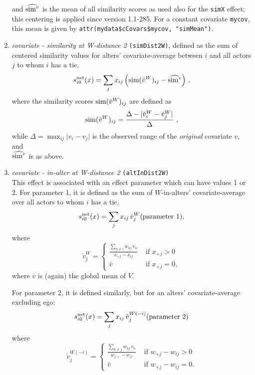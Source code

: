 \documentclass[a4paper,fleqn,11pt]{article}
\newcommand{\+}{\, + \,}
\newcommand{\vit}{\theenumi}
\begin{document}
\begin{enumerate}
 and $\widehat{{\rm sim}^v}$ is the mean of all similarity scores as used also
 for the \texttt{simX} effect; this centering is applied since version 1.1-285.
 For a constant covariate \texttt{mycov}, this mean is given by
 \texttt{attr(mydata\$cCovars\$mycov, "simMean")}.\\

 \item \emph{covariate - similarity at W-distance 2} \texttt{(simDist2W)}, %
      defined as the sum of centered similarity
      values for alters' covariate-average between $i$ and all actors
      $j$ to whom $i$ has a tie,
\[
 s^{\rm net}_{i\vit}(x) = \sum_j x_{ij}\, \Big({\rm sim}(\breve v^W)_{ij}
  -  \widehat{{\rm sim}^v}\Big) \ ,
\]
 where the similarity scores ${\rm sim}(\breve v^W)_{ij}$ are defined as
\[
{\rm sim}(\breve v^W)_{ij}=
 \frac{\Delta-\vert \breve v_i^W - \breve v_j^W \vert}{\Delta} \ ,
\]
 while
 $\Delta=\max_{ij}\vert v_i - v_j \vert$ is the observed range of the
 \emph{original} covariate $v$, and\\
  $\widehat{{\rm sim}^v}$ is as above.



\item \emph{covariate - in-alter at W-distance 2} \texttt{(altInDist2W)} \\ %
      This effect is associated with an effect parameter
      which can have values 1 or 2.
      For parameter 1, it is
      defined as the sum of $W$-in-alters' covariate-average over all actors
      to whom $i$ has a tie,
\[
 s^{\rm net}_{i\vit}(x) = \sum_j x_{ij}\, \check v_j^W \hfill (\text{parameter 1}), \hfill
\]
      where
\begin{equation}
  \check v_j^W  = \left\{\begin{array}{ll} \displaystyle
         \frac{\sum_{h \neq i} w_{hj}\,v_h}{x_{+j} - x_{ij}}  &
                                       \text{ if } x_{+j} > 0     \\
         \bar v                                &  \text{ if } x_{+j} = 0  ,
  \end{array}   \right.            \label{alt_inav2}
\end{equation}
where $\bar v$ is (again) the global mean of $V$.

      For parameter 2, it is defined similarly,
      but for an alters' covariate-average excluding
      ego:
\[
 s^{\rm net}_{i\vit}(x) = \sum_j x_{ij}\, \check v_j^{W(-i)} \hfill (\text{parameter 2}) \hfill
\]
      where
\begin{equation}
  \check v_j^{W(-i)} = \left\{\begin{array}{ll} \displaystyle
         \frac{\sum_{h \neq j} w_{hj}\, v_h}{w_{j+} - w_{ji}}  &  \text{ if } w_{+j} - w_{ij} > 0     \\
         \bar v                               &  \text{ if } w_{+j}- w_{ij} = 0  .
  \end{array}   \right.
\end{equation}


\end{enumerate}
\end{document}
